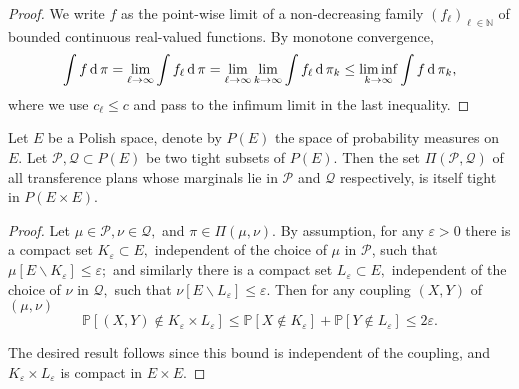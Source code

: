 \begin{proof}
	We write \( f \)  as the point-wise limit of a non-decreasing family \( \left( f _ { \ell } \right) _ { \ell \in \mathbb{ N } } \) of  bounded continuous real-valued functions.
	By monotone convergence,
	\[
		\int f \operatorname{d} \pi = \lim _ { \ell \rightarrow \infty } \int f _ { \ell } \operatorname{d} \pi = \lim _ { \ell \rightarrow \infty } \lim _ { k \rightarrow \infty } \int f _ { \ell } \operatorname{d} \pi _ { k } \leq \liminf _ { k \rightarrow \infty } \int f \operatorname{d} \pi _ { k },
	\]
	where we use $c_\ell \leq c$ and pass to the infimum limit in the last inequality.
\end{proof}

\begin{lem}
	\label{lem:tightness_transference_plan}
	Let $E$ be a Polish space, denote by $P(E)$ the space of probability measures on $E$.
	Let \( \mathcal{ P }, \mathcal{ Q } \subset P ( E ) \) be two tight subsets of \( P ( E ) \).
	Then the set \( \Pi ( \mathcal{ P } , \mathcal{ Q } ) \) of all transference plans whose marginals lie in \( \mathcal{ P } \) and \( \mathcal{ Q } \) respectively, is itself tight in \( P ( E \times E ) \).
\end{lem}

\begin{proof}
	Let \( \mu \in \mathcal{ P } , \nu \in \mathcal{ Q } , \) and \( \pi \in \Pi ( \mu , \nu ) . \) By assumption, for any \( \varepsilon > 0 \) there is a compact set \( K _ { \varepsilon } \subset E , \) independent of the choice of \( \mu \) in \( \mathcal{ P } \), such that \( \mu \left[ E \backslash K _ { \varepsilon } \right] \leq \varepsilon ; \) and similarly there is a compact set \( L _ { \varepsilon } \subset E , \) independent of the choice of \( \nu \) in \( \mathcal{ Q } , \) such that \( \nu \left[ E \backslash L _ { \varepsilon } \right] \leq \varepsilon . \) Then for any coupling \( ( X , Y ) \) of \( ( \mu , \nu ) \)
	\[ \mathbb{ P } \left[ ( X , Y ) \notin K _ { \varepsilon } \times L _ { \varepsilon } \right] \leq \mathbb{ P } \left[ X \notin K _ { \varepsilon } \right] + \mathbb{ P } \left[ Y \notin L _ { \varepsilon } \right] \leq 2 \varepsilon. \]

	The desired result follows since this bound is independent of the coupling, and \( K _ { \varepsilon } \times L _ { \varepsilon } \) is compact in \( E \times E  \).
\end{proof}

